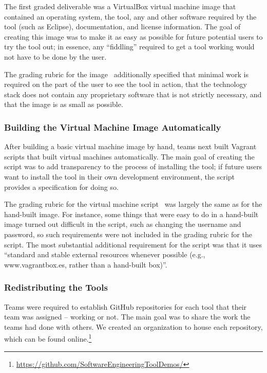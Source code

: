 \documentclass[10pt,conference]{IEEEtran}
\begin{document}
The first graded deliverable was a VirtualBox virtual machine
image that contained an operating system, the tool, any
and other software required by the tool (such as Eclipse),
documentation, and license information.
The goal of creating this image was to make it as
easy as possible for future potential users to try
the tool out; in essence, any ``fiddling'' required to get
a tool working would not have to be done by the user.

The grading rubric for the image~\cite{vm}
additionally specified that minimal work is required
on the part of the user to see the tool in action,
that the technology stack does not contain any proprietary 
software that is not strictly necessary,
and that the image is as small as possible.


\subsubsection{Building the Virtual Machine Image Automatically}

After building a basic virtual machine image by hand,
teams next built Vagrant scripts that built virtual machines
automatically.
The main goal of creating the script was to add 
transparency to the process
of installing the tool; if future users want to install the tool
in their own development environment, the script provides a
specification for doing so.

The grading rubric for the virtual machine 
script~\cite{vmscript}
was largely the same as for the hand-built image.
For instance, some things that were easy to do in a hand-built 
image turned out difficult in the script, such as changing 
the username and password, so such requirements were 
not included in the grading rubric for the script.
The most substantial additional requirement for the script
was that it uses ``standard and stable external resources 
whenever possible (e.g., www.vagrantbox.es, rather than a 
hand-built box)''.

\subsubsection{Redistributing the Tools}

Teams were required to establish GitHub repositories 
for each tool that their team was assigned -- working or not.
The main goal was to share the work the teams had 
done with others.
We created an organization to house each repository,
which can be found 
online.\footnote{\url{https://github.com/SoftwareEngineeringToolDemos/}}
\end{document}
